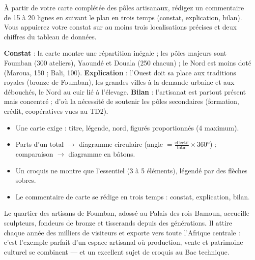 \documentclass[11pt]{article}
\newcommand{\cle}[1]{{\popxbold\color{popdark}#1}}
\begin{document}
\begin{exercice}
À partir de votre carte complétée des pôles artisanaux, rédigez un commentaire de 15 à 20 lignes en suivant le plan en trois temps (constat, explication, bilan). Vous appuierez votre constat sur au moins trois localisations précises et deux chiffres du tableau de données.
\end{exercice}

\begin{corrige}
\textbf{Constat} : la carte montre une répartition inégale ; les pôles majeurs sont Foumban (300 ateliers), Yaoundé et Douala (250 chacun) ; le Nord est moins doté (Maroua, 150 ; Bali, 100). \textbf{Explication} : l'Ouest doit sa place aux traditions royales (bronze de Foumban), les grandes villes à la demande urbaine et aux débouchés, le Nord au cuir lié à l'élevage. \textbf{Bilan} : l'artisanat est partout présent mais concentré ; d'où la nécessité de soutenir les pôles secondaires (formation, crédit, coopératives vues au TD2).
\end{corrige}

\begin{aretenir}[L'essentiel du TP]
\begin{itemize}
\item Une carte exige : \cle{titre}, \cle{légende}, \cle{nord}, figurés \cle{proportionnés} (4 maximum).
\item Parts d'un total $\rightarrow$ diagramme \cle{circulaire} (angle $= \frac{\text{effectif}}{\text{total}}\times 360°$) ; comparaison $\rightarrow$ diagramme en \cle{bâtons}.
\item Un croquis ne montre que \cle{l'essentiel} (3 à 5 éléments), légendé par des flèches sobres.
\item Le commentaire de carte se rédige en trois temps : \cle{constat}, \cle{explication}, \cle{bilan}.
\end{itemize}
\end{aretenir}

\begin{savaistu}
Le quartier des artisans de Foumban, adossé au Palais des rois Bamoun, accueille sculpteurs, fondeurs de bronze et tisserands depuis des générations. Il attire chaque année des milliers de visiteurs et exporte vers toute l'Afrique centrale : c'est l'exemple parfait d'un espace artisanal où production, vente et patrimoine culturel se combinent — et un excellent sujet de croquis au Bac technique.
\end{savaistu}
\end{document}
